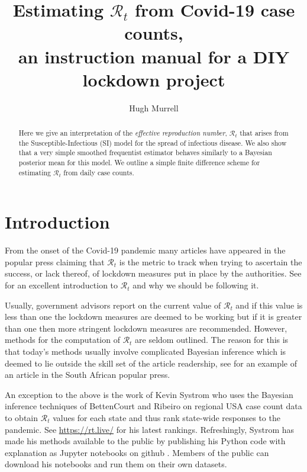 \documentclass[11pt]{article}
\begin{document}
\title{Estimating $\mathcal{R}_t$ from Covid-19 case counts, \\
an instruction manual for a DIY lockdown project }
\author{ Hugh Murrell}
\maketitle

\begin{abstract}
\noindent Here we give an interpretation of
the {\it effective reproduction number}, $\mathcal{R}_t$ that arises
from the Susceptible-Infectious (SI) model 
for the spread of infectious disease. We also show that
a very simple smoothed frequentist estimator behaves 
similarly to a Bayesian posterior mean for this model.
We outline a simple  finite difference scheme for
estimating $\mathcal{R}_t$ from daily case counts.
\end{abstract}

\section{Introduction}

From the onset of the Covid-19 pandemic many articles have appeared
in the popular press claiming that $\mathcal{R}_t$ is the metric to track when trying
to ascertain the success, or lack thereof, of lockdown measures put in place
by the authorities. See \cite{groundup} for an excellent introduction to 
$\mathcal{R}_t$ and why we should be following it. 

Usually, government advisors report on the current value of $\mathcal{R}_t$
and if this value is less than one the lockdown measures are deemed to be working
but if it is greater than one then more stringent lockdown measures are recommended.
However, methods for the computation of $\mathcal{R}_t$ are seldom outlined.
The reason for this is that today's methods usually involve complicated
Bayesian inference which is deemed to lie outside the skill set of the article 
readership, see \cite{news24} for an example of an article in the South African
popular press.

An exception to the above is the work of Kevin Systrom who uses the 
Bayesian inference techniques of BettenCourt and Ribeiro \cite{bettencourt}
on regional USA case count data to obtain $\mathcal{R}_t$
values for each state and thus rank state-wide responses to the pandemic. See
\href{https://rt.live/}{https://rt.live/} for his latest rankings. 
Refreshingly, Systrom has made his methods available to the public by publishing 
his Python code with explanation as Jupyter notebooks on github \cite{systrom}.
Members of the public can download his notebooks and run them on their
own datasets.
\end{document}
